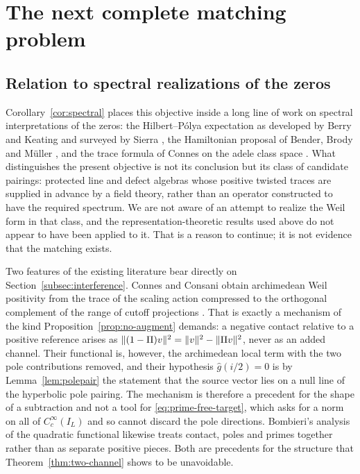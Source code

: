 \section{The next complete matching problem}\label{sec:outlook}
\subsection{Relation to spectral realizations of the zeros}
Corollary~\ref{cor:spectral} places this objective inside a long line of work
on spectral interpretations of the zeros: the Hilbert--P\'olya expectation as
developed by Berry and Keating \cite{BerryKeating} and surveyed by Sierra
\cite{Sierra}, the Hamiltonian proposal of Bender, Brody and M\"uller
\cite{BBM}, and the trace formula of Connes on the adele class space
\cite{ConnesTrace,CCM}. What distinguishes the present objective is not its
conclusion but its class of candidate pairings: protected line and defect
algebras whose positive twisted traces are supplied in advance by a field
theory, rather than an operator constructed to have the required spectrum.
We are not aware of an attempt to realize the Weil form in that class, and
the representation-theoretic results used above
\cite{Sphere,Schur,RG,EKRS,Klyuev} do not appear to have been applied to it.
That is a reason to continue; it is not evidence that the matching exists.

Two features of the existing literature bear directly on
Section~\ref{subsec:interference}. Connes and Consani obtain archimedean Weil
positivity from the trace of the scaling action compressed to the orthogonal
complement of the range of cutoff projections \cite{CCWeil}. That is exactly
a mechanism of the kind Proposition~\ref{prop:no-augment} demands: a negative
contact relative to a positive reference arises as
$\lVert (1-\Pi)v\rVert^2=\lVert v\rVert^2-\lVert \Pi v\rVert^2$, never as an added channel.
Their functional is, however, the archimedean local term with the two pole
contributions removed, and their hypothesis $\widehat g(i/2)=0$ is by
Lemma~\ref{lem:polepair} the statement that the source vector lies on a null
line of the hyperbolic pole pairing. The mechanism is therefore a precedent
for the shape of a subtraction and not a tool for \eqref{eq:prime-free-target},
which asks for a norm on all of $C_c^\infty(I_L)$ and so cannot discard the
pole directions. Bombieri's analysis of the quadratic functional
\cite{Bombieri} likewise treats contact, poles and primes together rather than
as separate positive pieces. Both are precedents for the structure that
Theorem~\ref{thm:two-channel} shows to be unavoidable.


